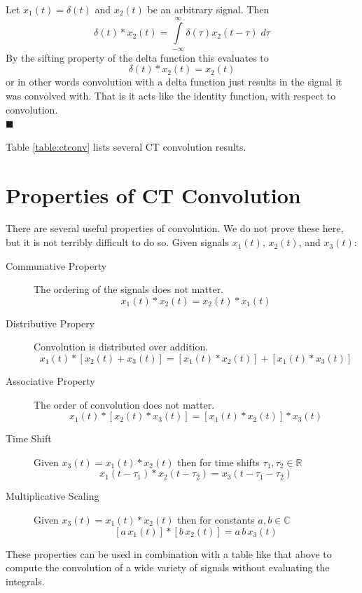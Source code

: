 \begin{example} Let $x_1(t) = \delta(t)$ and $x_2(t)$ be an arbitrary signal. Then
  \[
  \delta(t) * x_2(t) = \int\limits_{-\infty}^{\infty} \delta(\tau)x_2(t-\tau) \; d\tau
  \]
  By the sifting property of the delta function this evaluates to
  \[
  \delta(t) * x_2(t) = x_2(t)
  \]
  or in other words convolution with a delta function just results in the signal it was convolved with. That is it acts like the identity function, with respect to convolution.\\
  $\blacksquare$
\end{example}

\noindent Table \ref{table:ctconv} lists several CT convolution results.

\section{Properties of CT Convolution}
There are several useful properties of convolution. We do not prove these here, but it is not terribly difficult to do so. Given signals $x_1(t)$, $x_2(t)$, and $x_3(t)$:

\begin{description}
\item [Communative Property] The ordering of the signals does not matter.
  \[
x_1(t) * x_2(t) = x_2(t) * x_1(t)
  \]
\item [Distributive Propery] Convolution is distributed over addition.
  \[
  x_1(t) * \left[x_2(t) + x_3(t)\right] = \left[x_1(t) * x_2(t) \right] + \left[x_1(t) * x_3(t) \right] 
  \]
\item [Associative Property] The order of convolution does not matter.
    \[
  x_1(t) * \left[x_2(t) * x_3(t)\right] = \left[x_1(t) * x_2(t) \right] * x_3(t) 
  \]
\item [Time Shift] Given $x_3(t) = x_1(t) * x_2(t)$ then for time shifts $\tau_1, \tau_2 \in \mathbb{R}$
  \[
  x_1(t-\tau_1) * x_2(t-\tau_2) = x_3(t-\tau_1 - \tau_2)
  \]
\item [Multiplicative Scaling] Given $x_3(t) = x_1(t) * x_2(t)$ then for constants $a,b \in \mathbb{C}$
  \[
  \left[a\, x_1(t)\right] * \left[b\, x_2(t)\right] = a\, b\, x_3(t)
  \]
\end{description}

These properties can be used in combination with a table like that above to compute the convolution of a wide variety of signals without evaluating the integrals.

